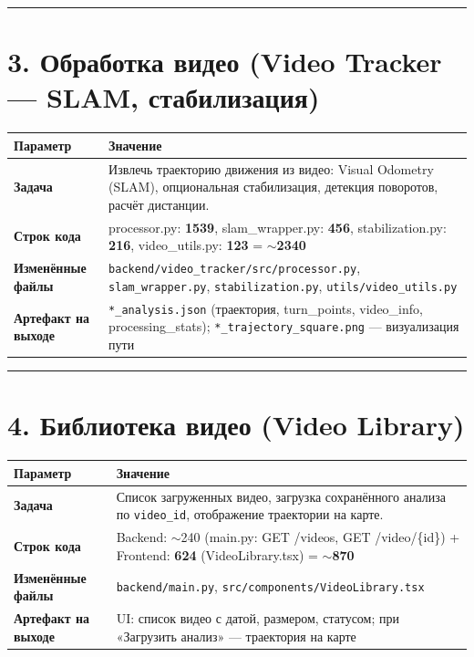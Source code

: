 \documentclass[12pt,a4paper]{article}
\begin{document}
\vspace{1em}
\hrule
\vspace{1em}

\section{3. Обработка видео (Video Tracker — SLAM, стабилизация)}

\begin{tabular}{>{\bfseries}l p{10cm}}
\toprule
Параметр & Значение \\
\midrule
Задача & Извлечь траекторию движения из видео: Visual Odometry (SLAM), опциональная стабилизация, детекция поворотов, расчёт дистанции. \\
Строк кода & processor.py: \textbf{1539}, slam\_wrapper.py: \textbf{456}, stabilization.py: \textbf{216}, video\_utils.py: \textbf{123} = \textbf{$\sim$2340} \\
Изменённые файлы & \texttt{backend/video\_tracker/src/processor.py}, \texttt{slam\_wrapper.py}, \texttt{stabilization.py}, \texttt{utils/video\_utils.py} \\
Артефакт на выходе & \texttt{*\_analysis.json} (траектория, turn\_points, video\_info, processing\_stats); \texttt{*\_trajectory\_square.png} — визуализация пути \\
\bottomrule
\end{tabular}

\vspace{1em}
\hrule
\vspace{1em}

\section{4. Библиотека видео (Video Library)}

\begin{tabular}{>{\bfseries}l p{10cm}}
\toprule
Параметр & Значение \\
\midrule
Задача & Список загруженных видео, загрузка сохранённого анализа по \texttt{video\_id}, отображение траектории на карте. \\
Строк кода & Backend: $\sim$240 (main.py: GET /videos, GET /video/\{id\}) + Frontend: \textbf{624} (VideoLibrary.tsx) = \textbf{$\sim$870} \\
Изменённые файлы & \texttt{backend/main.py}, \texttt{src/components/VideoLibrary.tsx} \\
Артефакт на выходе & UI: список видео с датой, размером, статусом; при «Загрузить анализ» — траектория на карте \\
\bottomrule
\end{tabular}
\end{document}
